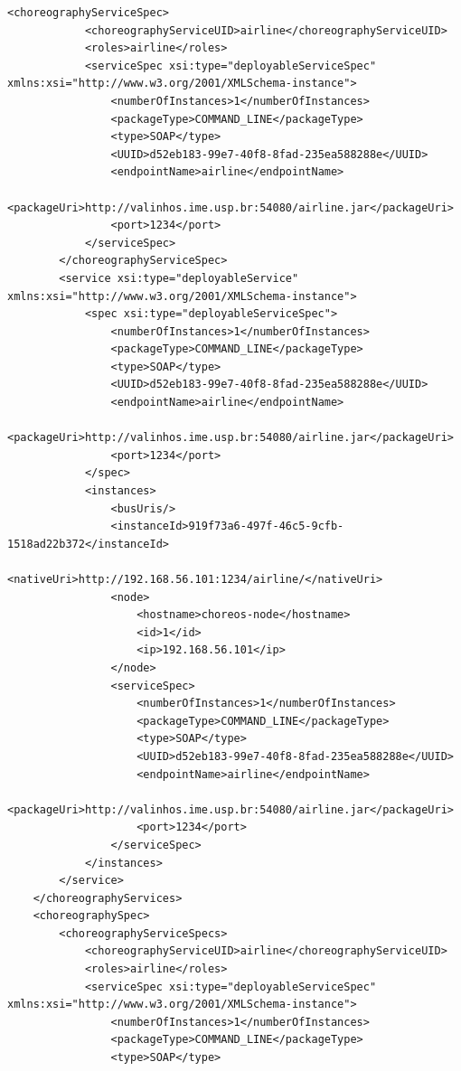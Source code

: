 \documentclass[a4paper, 10pt]{article}
\begin{document}
{\begin{lstlisting}[caption=Choreography XML representation example, label=lst:chor_xml]
        <choreographyServiceSpec>
            <choreographyServiceUID>airline</choreographyServiceUID>
            <roles>airline</roles>
            <serviceSpec xsi:type="deployableServiceSpec" 
xmlns:xsi="http://www.w3.org/2001/XMLSchema-instance">
                <numberOfInstances>1</numberOfInstances>
                <packageType>COMMAND_LINE</packageType>
                <type>SOAP</type>
                <UUID>d52eb183-99e7-40f8-8fad-235ea588288e</UUID>
                <endpointName>airline</endpointName>
                <packageUri>http://valinhos.ime.usp.br:54080/airline.jar</packageUri>
                <port>1234</port>
            </serviceSpec>
        </choreographyServiceSpec>
        <service xsi:type="deployableService" 
xmlns:xsi="http://www.w3.org/2001/XMLSchema-instance">
            <spec xsi:type="deployableServiceSpec">
                <numberOfInstances>1</numberOfInstances>
                <packageType>COMMAND_LINE</packageType>
                <type>SOAP</type>
                <UUID>d52eb183-99e7-40f8-8fad-235ea588288e</UUID>
                <endpointName>airline</endpointName>
                <packageUri>http://valinhos.ime.usp.br:54080/airline.jar</packageUri>
                <port>1234</port>
            </spec>
            <instances>
                <busUris/>
                <instanceId>919f73a6-497f-46c5-9cfb-1518ad22b372</instanceId>
                <nativeUri>http://192.168.56.101:1234/airline/</nativeUri>
                <node>
                    <hostname>choreos-node</hostname>
                    <id>1</id>
                    <ip>192.168.56.101</ip>
                </node>
                <serviceSpec>
                    <numberOfInstances>1</numberOfInstances>
                    <packageType>COMMAND_LINE</packageType>
                    <type>SOAP</type>
                    <UUID>d52eb183-99e7-40f8-8fad-235ea588288e</UUID>
                    <endpointName>airline</endpointName>
                    <packageUri>http://valinhos.ime.usp.br:54080/airline.jar</packageUri>
                    <port>1234</port>
                </serviceSpec>
            </instances>
        </service>
    </choreographyServices>
    <choreographySpec>
        <choreographyServiceSpecs>
            <choreographyServiceUID>airline</choreographyServiceUID>
            <roles>airline</roles>
            <serviceSpec xsi:type="deployableServiceSpec" 
xmlns:xsi="http://www.w3.org/2001/XMLSchema-instance">
                <numberOfInstances>1</numberOfInstances>
                <packageType>COMMAND_LINE</packageType>
                <type>SOAP</type>

\end{lstlisting}}
\end{document}
